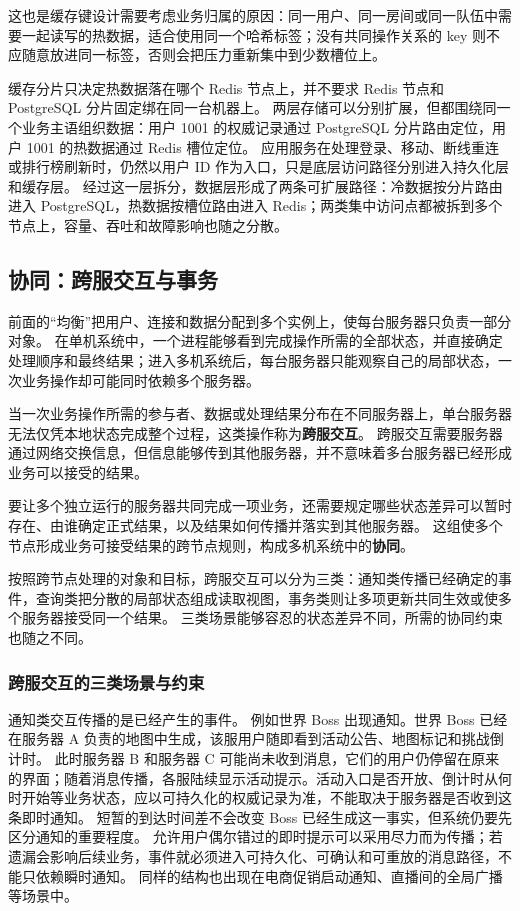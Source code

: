 这也是缓存键设计需要考虑业务归属的原因：同一用户、同一房间或同一队伍中需要一起读写的热数据，适合使用同一个哈希标签；没有共同操作关系的 key 则不应随意放进同一标签，否则会把压力重新集中到少数槽位上。

缓存分片只决定热数据落在哪个 Redis 节点上，并不要求 Redis 节点和 PostgreSQL 分片固定绑在同一台机器上。
两层存储可以分别扩展，但都围绕同一个业务主语组织数据：用户 1001 的权威记录通过 PostgreSQL 分片路由定位，用户 1001 的热数据通过 Redis 槽位定位。
应用服务在处理登录、移动、断线重连或排行榜刷新时，仍然以用户 ID 作为入口，只是底层访问路径分别进入持久化层和缓存层。
经过这一层拆分，数据层形成了两条可扩展路径：冷数据按分片路由进入 PostgreSQL，热数据按槽位路由进入 Redis；两类集中访问点都被拆到多个节点上，容量、吞吐和故障影响也随之分散。


\subsection{协同：跨服交互与事务}\label{sec4:cross-server-coordination}

前面的“均衡”把用户、连接和数据分配到多个实例上，使每台服务器只负责一部分对象。
在单机系统中，一个进程能够看到完成操作所需的全部状态，并直接确定处理顺序和最终结果；进入多机系统后，每台服务器只能观察自己的局部状态，一次业务操作却可能同时依赖多个服务器。

当一次业务操作所需的参与者、数据或处理结果分布在不同服务器上，单台服务器无法仅凭本地状态完成整个过程，这类操作称为\textbf{跨服交互}。
跨服交互需要服务器通过网络交换信息，但信息能够传到其他服务器，并不意味着多台服务器已经形成业务可以接受的结果。

要让多个独立运行的服务器共同完成一项业务，还需要规定哪些状态差异可以暂时存在、由谁确定正式结果，以及结果如何传播并落实到其他服务器。
这组使多个节点形成业务可接受结果的跨节点规则，构成多机系统中的\textbf{协同}。

按照跨节点处理的对象和目标，跨服交互可以分为三类：通知类传播已经确定的事件，查询类把分散的局部状态组成读取视图，事务类则让多项更新共同生效或使多个服务器接受同一个结果。
三类场景能够容忍的状态差异不同，所需的协同约束也随之不同。

\subsubsection{跨服交互的三类场景与约束}\label{sec4:cross-server-interaction-types}

通知类交互传播的是已经产生的事件。
例如世界 Boss 出现通知。世界 Boss 已经在服务器 A 负责的地图中生成，该服用户随即看到活动公告、地图标记和挑战倒计时。
此时服务器 B 和服务器 C 可能尚未收到消息，它们的用户仍停留在原来的界面；随着消息传播，各服陆续显示活动提示。活动入口是否开放、倒计时从何时开始等业务状态，应以可持久化的权威记录为准，不能取决于服务器是否收到这条即时通知。
短暂的到达时间差不会改变 Boss 已经生成这一事实，但系统仍要先区分通知的重要程度。
允许用户偶尔错过的即时提示可以采用尽力而为传播；若遗漏会影响后续业务，事件就必须进入可持久化、可确认和可重放的消息路径，不能只依赖瞬时通知。
同样的结构也出现在电商促销启动通知、直播间的全局广播等场景中。

